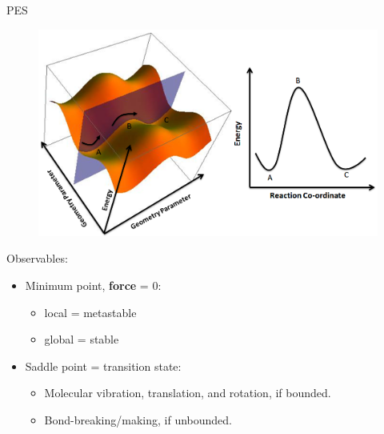 \documentclass{beamer}
\begin{document}
\begin{frame}{PES}
    \begin{figure}[htbp]
        \centering
        \includegraphics[scale=0.2]{img/slide/pes.png}
        \label{fig:pes}
    \end{figure}
    Observables:
    \begin{itemize}
        \item Minimum point, \textbf{force} = 0:
        \begin{itemize}
            \item local = metastable
            \item global = stable
        \end{itemize}
        \item Saddle point = transition state:
            \begin{itemize}
                \item Molecular vibration, translation, and rotation, if bounded.
                \item Bond-breaking/making, if unbounded.
            \end{itemize}
    \end{itemize}
\end{frame}
\end{document}

